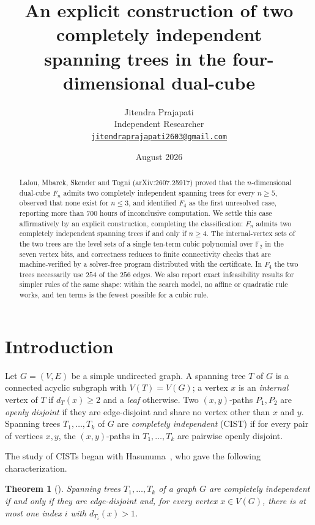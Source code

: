 \documentclass[11pt]{article}
\title{An explicit construction of two completely independent\\
spanning trees in the four-dimensional dual-cube}
\author{Jitendra Prajapati\\ \small Independent Researcher\\ \small \href{mailto:jitendraprajapati2603@gmail.com}{\texttt{jitendraprajapati2603@gmail.com}}}
\date{August 2026}
\newtheorem{theorem}{Theorem}
\theoremstyle{remark}
\begin{document}
\maketitle

\begin{abstract}
Lalou, Mbarek, Skender and Togni (arXiv:2607.25917) proved that the
$n$-dimensional dual-cube $F_n$ admits two completely independent spanning
trees for every $n\ge 5$, observed that none exist for $n\le 3$, and
identified $F_4$ as the first unresolved case, reporting more than $700$
hours of inconclusive computation. We settle this case affirmatively by an
explicit construction, completing the classification: $F_n$ admits two
completely independent spanning trees if and only if $n\ge 4$. The
internal-vertex sets of the two trees are the level sets of a single
ten-term cubic polynomial over $\mathbb{F}_2$ in the seven vertex bits, and
correctness reduces to finite connectivity checks that are machine-verified
by a solver-free program distributed with the certificate. In $F_4$ the two
trees necessarily use $254$ of the $256$ edges. We also report exact
infeasibility results for simpler rules of the same shape: within the
search model, no affine or quadratic rule works, and ten terms is the
fewest possible for a cubic rule.
\end{abstract}

\section{Introduction}

Let $G=(V,E)$ be a simple undirected graph. A spanning tree $T$ of $G$ is a
connected acyclic subgraph with $V(T)=V(G)$; a vertex $x$ is an
\emph{internal} vertex of $T$ if $d_T(x)\ge 2$ and a \emph{leaf} otherwise.
Two $(x,y)$-paths $P_1,P_2$ are \emph{openly disjoint} if they are
edge-disjoint and share no vertex other than $x$ and $y$. Spanning trees
$T_1,\dots,T_k$ of $G$ are \emph{completely independent} (CIST) if for
every pair of vertices $x,y$, the $(x,y)$-paths in $T_1,\dots,T_k$ are
pairwise openly disjoint.

The study of CISTs began with Hasunuma~\cite{Hasunuma2001}, who gave the
following characterization.

\begin{theorem}[\cite{Hasunuma2001}]\label{thm:hasunuma}
Spanning trees $T_1,\dots,T_k$ of a graph $G$ are completely independent if
and only if they are edge-disjoint and, for every vertex $x\in V(G)$, there
is at most one index $i$ with $d_{T_i}(x)>1$.
\end{theorem}
\end{document}
